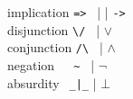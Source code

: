 \documentclass[manual.tex]{subfiles}
\begin{document}
{\ttfamily
\noindent
implication \tra \verb+=> + | \tra | \verb+->+\\
disjunction \tra \verb+\/ + | \(\lor\) \\
conjunction \tra \verb+/\ + | \(\land\) \\
negation $~~~$\tra \verb+ ~ + | \(\neg\) \\
absurdity $~~$\tra \verb+_|_+ | \(\bot\)
}
\end{document}
